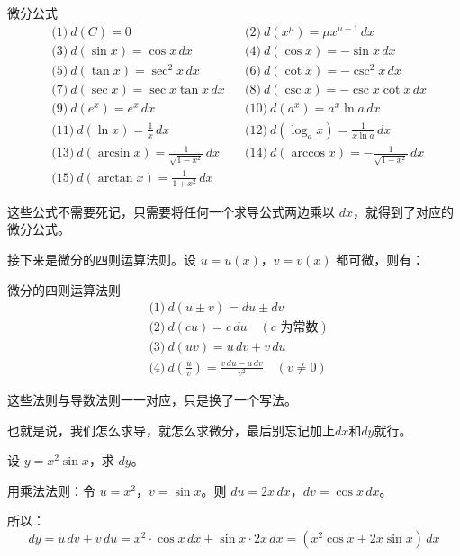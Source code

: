 \begin{theorem}{微分公式}{}
  \[
  \begin{aligned}
  &\text{(1)}\ d(C) = 0
  &&\text{(2)}\ d(x^\mu) = \mu x^{\mu-1}\, dx \\[4pt]
  &\text{(3)}\ d(\sin x) = \cos x\, dx
  &&\text{(4)}\ d(\cos x) = -\sin x\, dx \\[4pt]
  &\text{(5)}\ d(\tan x) = \sec^2 x\, dx
  &&\text{(6)}\ d(\cot x) = -\csc^2 x\, dx \\[4pt]
  &\text{(7)}\ d(\sec x) = \sec x \tan x\, dx
  &&\text{(8)}\ d(\csc x) = -\csc x \cot x\, dx \\[4pt]
  &\text{(9)}\ d(e^x) = e^x\, dx
  &&\text{(10)}\ d(a^x) = a^x \ln a\, dx \\[4pt]
  &\text{(11)}\ d(\ln x) = \frac{1}{x}\, dx
  &&\text{(12)}\ d(\log_a x) = \frac{1}{x \ln a}\, dx \\[4pt]
  &\text{(13)}\ d(\arcsin x) = \frac{1}{\sqrt{1-x^2}}\, dx
  &&\text{(14)}\ d(\arccos x) = -\frac{1}{\sqrt{1-x^2}}\, dx \\[4pt]
  &\text{(15)}\ d(\arctan x) = \frac{1}{1+x^2}\, dx
  \end{aligned}
  \]
\end{theorem}

这些公式不需要死记，只需要将任何一个求导公式两边乘以 $dx$，就得到了对应的微分公式。

接下来是微分的四则运算法则。设 $u = u(x)$，$v = v(x)$ 都可微，则有：

\begin{theorem}{微分的四则运算法则}{}
\[
\begin{aligned}
&\text{(1)}\ d(u \pm v) = du \pm dv \\[4pt]
&\text{(2)}\ d(cu) = c\, du \quad (c\text{ 为常数}) \\[4pt]
&\text{(3)}\ d(uv) = u\, dv + v\, du \\[4pt]
&\text{(4)}\ d(\frac{u}{v}) = \frac{v\, du - u\, dv}{v^2} \quad (v \neq 0)
\end{aligned}
\]
\end{theorem}

这些法则与导数法则一一对应，只是换了一个写法。

也就是说，我们怎么求导，就怎么求微分，最后别忘记加上$dx$和$dy$就行。

\begin{myexample}
  设 $y = x^2 \sin x$，求 $dy$。

  用乘法法则：令 $u = x^2$，$v = \sin x$。则
  \(du = 2x\, dx\)，\( dv = \cos x\, dx\)。

  所以：
  \[
  dy = u\, dv + v\, du = x^2 \cdot \cos x\, dx + \sin x \cdot 2x\, dx = (x^2 \cos x + 2x \sin x)\, dx
  \]
\end{myexample}

